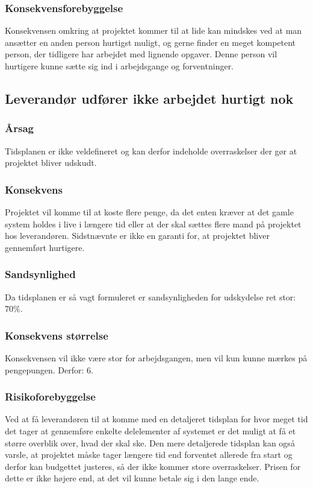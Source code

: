 \documentclass[10pt,a4paper,danish]{article}
\begin{document}
\subsubsection{Konsekvensforebyggelse}
Konsekvensen omkring at projektet kommer til at lide kan mindskes ved at man ansætter en anden person hurtigst muligt, og gerne finder en meget kompetent person, der tidligere har arbejdet med lignende opgaver. Denne person vil hurtigere kunne sætte sig ind i arbejdsgange og forventninger.


\subsection{Leverandør udfører ikke arbejdet hurtigt nok}
\subsubsection{Årsag}
Tidsplanen er ikke veldefineret og kan derfor indeholde overraskelser der gør at projektet bliver udskudt.

\subsubsection{Konsekvens}
Projektet vil komme til at koste flere penge, da det enten kræver at det gamle system holdes i live i længere tid eller at der skal sættes flere mand på projektet hos leverandøren. Sidstnævnte er ikke en garanti for, at projektet bliver gennemført hurtigere.

\subsubsection{Sandsynlighed}
Da tidsplanen er så vagt formuleret er sandsynligheden for udskydelse ret stor: 70\%.

\subsubsection{Konsekvens størrelse}
Konsekvensen vil ikke være stor for arbejdsgangen, men vil kun kunne mærkes på pengepungen. Derfor: 6.

\subsubsection{Risikoforebyggelse}
Ved at få leverandøren til at komme med en detaljeret tidsplan for hvor meget tid det tager at gennemføre enkelte delelementer af systemet er det muligt at få et større overblik over, hvad der skal ske.
Den mere detaljerede tidsplan kan også varsle, at projektet måske tager længere tid end forventet allerede fra start og derfor kan budgettet justeres, så der ikke kommer store overraskelser.
Prisen for dette er ikke højere end, at det vil kunne betale sig i den lange ende.
\end{document}
